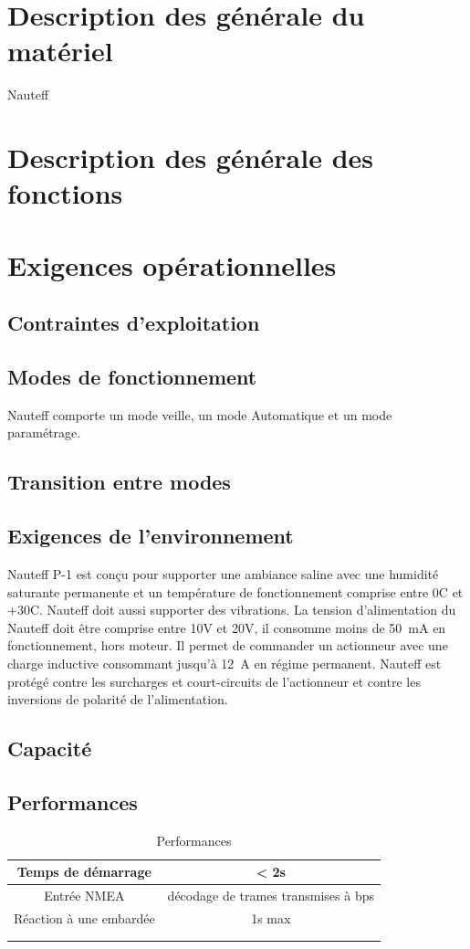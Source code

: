 \documentclass[a4paper,11pt]{report}
\begin{document}
\section{Description des générale du matériel}

Nauteff 


\section{Description des générale des fonctions}
\section{Exigences opérationnelles}
\subsection{Contraintes d'exploitation}
\subsection{Modes de fonctionnement}
Nauteff comporte un mode veille, un mode Automatique et un mode paramétrage.
\subsection{Transition entre modes}
\subsection{Exigences de l'environnement}
Nauteff P-1 est conçu pour supporter une ambiance saline avec une humidité
saturante permanente et un température de fonctionnement comprise entre   0\degres C et +30\degres C.
Nauteff doit aussi supporter des vibrations.
La tension d'alimentation du Nauteff doit être comprise entre 10V et 20V, il consomme moins de 50~mA en fonctionnement, hors moteur.
Il permet de commander un actionneur avec une charge inductive consommant jusqu'à
12\ A en régime permanent.
Nauteff est protégé contre les surcharges et court-circuits de l'actionneur et 
contre les inversions de polarité de l'alimentation.
\subsection{Capacité}
\subsection{Performances}
\begin{table}
\begin{tabular}{|c|c|}
	\hline 
	Temps de démarrage &  < 2s \\ 
	\hline 
	Entrée NMEA& décodage de trames transmises à \numprint{230400} bps \\ 
	\hline 
	Réaction à une embardée & 1s max \\ 
	\hline 
	&  \\ 
	\hline 
	&  \\ 
	\hline 
\end{tabular}
\caption{Performances}
\end{table}
\end{document}
